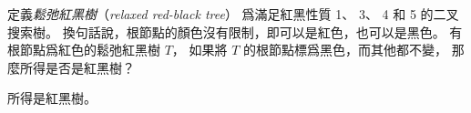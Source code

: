 \startEXERCISE
定義\emph{鬆弛紅黑樹}（\emph{relaxed red-black tree}）
爲滿足紅黑性質 1、 3、 4 和 5 的二叉搜索樹。
換句話說，根節點的顏色沒有限制，即可以是紅色，也可以是黑色。
有根節點爲紅色的鬆弛紅黑樹 $T$，
如果將 $T$ 的根節點標爲黑色，而其他都不變，
那麼所得是否是紅黑樹？
\stopEXERCISE

\startANSWER
所得是紅黑樹。
\stopANSWER
